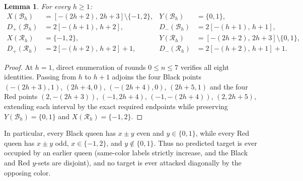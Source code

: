 \documentclass[11pt]{article}
\newtheorem{lemma}[theorem]{Lemma}
\begin{document}
\begin{lemma}\label{lem:inv}
For every $h \ge 1$:
\begin{align*}
  X(\mathcal{B}_h) &= [-(2h+2),\, 2h+3] \setminus \{-1, 2\}, & Y(\mathcal{B}_h) &= \{0, 1\}, \\
  D_+(\mathcal{B}_h) &= 2[-(h+1),\, h+2], & D_-(\mathcal{B}_h) &= 2[-(h+1),\, h+1], \\
  X(\mathcal{R}_h) &= \{-1, 2\}, & Y(\mathcal{R}_h) &= [-(2h+2),\, 2h+3] \setminus \{0, 1\}, \\
  D_+(\mathcal{R}_h) &= 2[-(h+2),\, h+2] + 1, & D_-(\mathcal{R}_h) &= 2[-(h+2),\, h+1] + 1.
\end{align*}
\end{lemma}

\begin{proof}
At $h = 1$, direct enumeration of rounds $0 \le n \le 7$ verifies all eight identities. Passing from $h$ to $h + 1$ adjoins the four Black points $(-(2h+3),1)$, $(2h+4,0)$, $(-(2h+4),0)$, $(2h+5,1)$ and the four Red points $(2,-(2h+3))$, $(-1,2h+4)$, $(-1,-(2h+4))$, $(2,2h+5)$, extending each interval by the exact required endpoints while preserving $Y(\mathcal{B}_h) = \{0, 1\}$ and $X(\mathcal{R}_h) = \{-1, 2\}$.
\end{proof}

In particular, every Black queen has $x \pm y$ even and $y \in \{0, 1\}$, while every Red queen has $x \pm y$ odd, $x \in \{-1, 2\}$, and $y \notin \{0, 1\}$. Thus no predicted target is ever occupied by an earlier queen (same-color labels strictly increase, and the Black and Red $y$-sets are disjoint), and no target is ever attacked diagonally by the opposing color.
\end{document}
